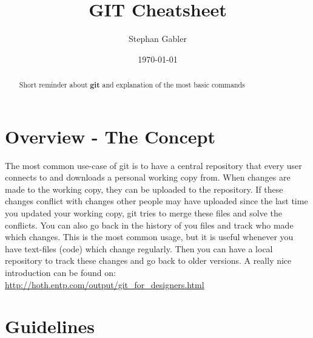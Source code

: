 \documentclass[]{article}
\title{GIT Cheatsheet}
\author{Stephan Gabler}
\date{\today}
\begin{document}
\ifpdf
{}
\else
{}
\fi

\maketitle


\begin{abstract}
	\begin{center}
		Short reminder about \textbf{git} and explanation of the most basic commands
	\end{center}
\end{abstract}

\section{Overview - The Concept} %
\label{sg:sec:overview}
The most common use-case of git is to have a central repository that every user connects to and downloads a personal working copy from. When changes are made to the working copy, they can be uploaded to the repository. If these changes conflict with changes other people may have uploaded since the last time you updated your working copy, git tries to merge these files and solve the conflicts. You can also go back in the history of you files and track who made which changes. 
This is the most common usage, but it is useful whenever you have text-files (code) which change regularly. Then you can have a local repository to track these changes and go back to older versions. A really nice introduction can be found on: \url{http://hoth.entp.com/output/git_for_designers.html} 


\section{Guidelines} %
\label{sg:sec:guidelines}
\end{document}
